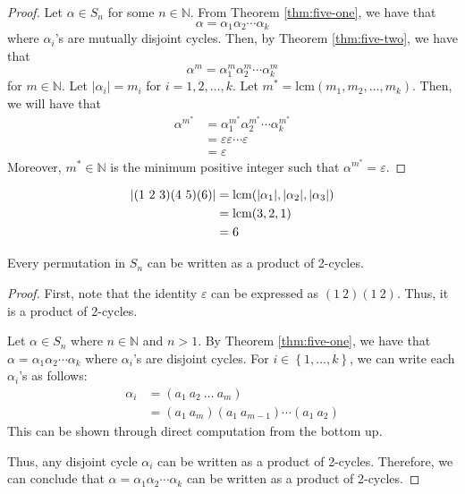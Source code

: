 \begin{proof}
    Let \(\alpha \in S_n\) for some \(n \in \mathbb{N}\). From Theorem \ref{thm:five-one}, we have that
    \[
        \alpha = \alpha_1 \alpha_2 \cdots \alpha_k
    \]
    where \(\alpha_i\)'s are mutually disjoint cycles. Then, by Theorem \ref{thm:five-two}, we have that
    \[
        \alpha^m = \alpha_1^m \alpha_2^m \cdots \alpha_k^m
    \]
    for \(m \in \mathbb{N}\). Let \(|\alpha_i| = m_i\) for \(i = 1, 2, \ldots, k\). Let \(m^* = \text{lcm}(m_1, m_2, \ldots, m_k)\). Then, we will have that  
    \[
    \begin{aligned}
        \alpha^{m^*} &= \alpha_1^{m^*}\alpha_2^{m^*} \cdots \alpha_k^{m^*} \\
                     &= \varepsilon \varepsilon \cdots \varepsilon \\
                     &= \varepsilon
    \end{aligned}
    \]
    Moreover, \(m^* \in \mathbb{N}\) is the minimum positive integer such that \(\alpha^{m^*} = \varepsilon\).
\end{proof}

\begin{nexample}
    \[
    \begin{aligned}
        |(1\ 2\ 3) (4\ 5) (6)| &= \operatorname{lcm}(|\alpha_1|, |\alpha_2|, |\alpha_3|) \\
                               &= \operatorname{lcm}(3, 2, 1) \\
                               &= 6
    \end{aligned}
    \]
\end{nexample}

\begin{theorem}
    Every permutation in \(S_n\) can be written as a product of 2-cycles.
\end{theorem}

\begin{proof}
    First, note that the identity \(\varepsilon\) can be expressed as \((1\ 2)(1\ 2)\). Thus, it is a product of 2-cycles.

    Let \(\alpha \in S_n\) where \(n \in \mathbb{N}\) and \(n > 1\). By Theorem \ref{thm:five-one}, we have that \(\alpha = \alpha_1 \alpha_2 \cdots \alpha_k\) where \(\alpha_i\)'s are disjoint cycles. For \(i \in \left\{1, \ldots, k\right\}\), we can write each \(\alpha_i\)'s as follows:
    \[
    \begin{aligned}
        \alpha_i &= (a_1\ a_2\ \ldots\ a_m) \\
                 &= (a_1\ a_m) (a_1\ a_{m-1}) \cdots (a_1\ a_2)
    \end{aligned}
    \]
    This can be shown through direct computation from the bottom up.

    Thus, any disjoint cycle \(\alpha_i\) can be written as a product of 2-cycles. Therefore, we can conclude that \(\alpha = \alpha_1 \alpha_2 \cdots \alpha_k\) can be written as a product of 2-cycles.
\end{proof}

